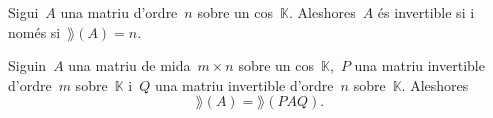 \documentclass[../../main.tex]{subfiles}
\begin{document}
	\begin{corollary}
		Sigui~\(A\) una matriu d'ordre~\(n\) sobre un cos~\(\mathbb{K}\).
		Aleshores~\(A\) és invertible si i només si~\(\rang(A)=n\).
	\end{corollary}
	\begin{observation}
		\label{obs:rang d'una matriu és invariant pel producte amb invertibles}
		Siguin~\(A\) una matriu de mida~\(m\times n\) sobre un cos~\(\mathbb{K}\),~\(P\) una matriu invertible d'ordre~\(m\) sobre~\(\mathbb{K}\) i~\(Q\) una matriu invertible d'ordre~\(n\) sobre~\(\mathbb{K}\).
		Aleshores
		\[
		    \rang(A)=\rang(PAQ).
		\]
	\end{observation}
%
\end{document}
